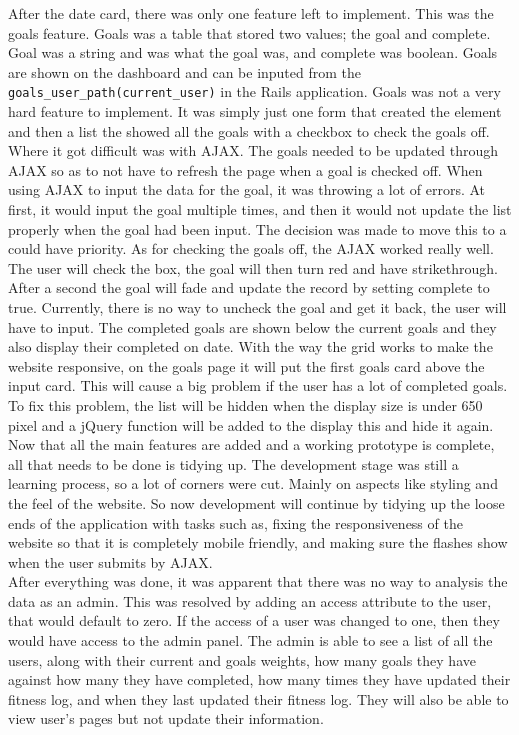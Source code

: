After the date card, there was only one feature left to implement. This was the goals feature. Goals was a table that stored two values; the goal and complete. Goal was a string and was what the goal was, and complete was boolean. Goals are shown on the dashboard and can be inputed from the \lstinline{goals_user_path(current_user)} in the Rails application. Goals was not a very hard feature to implement. It was simply just one form that created the element and then a list the showed all the goals with a checkbox to check the goals off. Where it got difficult was with AJAX. The goals needed to be updated through AJAX so as to not have to refresh the page when a goal is checked off. When using AJAX to input the data for the goal, it was throwing a lot of errors. At first, it would input the goal multiple times, and then it would not update the list properly when the goal had been input. The decision was made to move this to a could have priority. As for checking the goals off, the AJAX worked really well. The user will check the box, the goal will then turn red and have strikethrough. After a second the goal will fade and update the record by setting complete to true. Currently, there is no way to uncheck the goal and get it back, the user will have to input. The completed goals are shown below the current goals and they also display their completed on date. With the way the grid works to make the website responsive, on the goals page it will put the first goals card above the input card. This will cause a big problem if the user has a lot of completed goals. To fix this problem, the list will be hidden when the display size is under 650 pixel and a jQuery function will be added to the display this and hide it again.\\

Now that all the main features are added and a working prototype is complete, all that needs to be done is tidying up. The development stage was still a learning process, so a lot of corners were cut. Mainly on aspects like styling and the feel of the website. So now development will continue by tidying up the loose ends of the application with tasks such as, fixing the responsiveness of the website so that it is completely mobile friendly, and making sure the flashes show when the user submits by AJAX.\\

After everything was done, it was apparent that there was no way to analysis the data as an admin. This was resolved by adding an access attribute to the user, that would default to zero. If the access of a user was changed to one, then they would have access to the admin panel. The admin is able to see a list of all the users, along with their current and goals weights, how many goals they have against how many they have completed, how many times they have updated their fitness log, and when they last updated their fitness log. They will also be able to view user's pages but not update their information. \\

